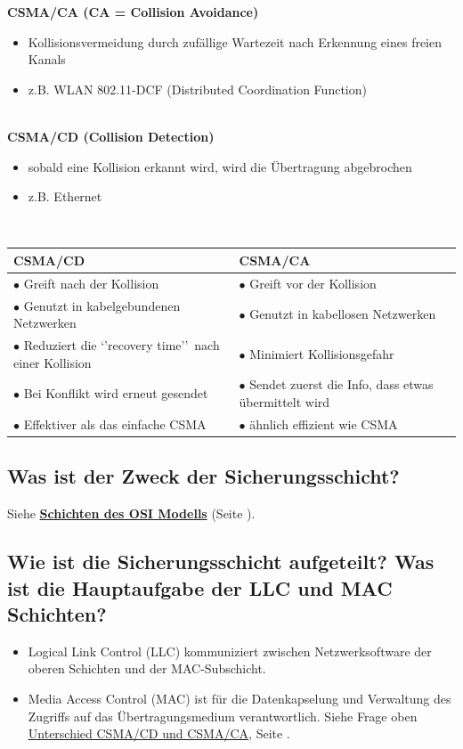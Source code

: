 \textbf{CSMA/CA (CA = Collision Avoidance)}
\begin{itemize}
    \item Kollisionsvermeidung durch zufällige Wartezeit nach Erkennung eines freien Kanals
    \item z.B. WLAN 802.11-DCF (Distributed Coordination Function)
\end{itemize}\,\\

\textbf{CSMA/CD (Collision Detection)}
\begin{itemize}
    \item sobald eine Kollision erkannt wird, wird die Übertragung abgebrochen
    \item z.B. Ethernet
\end{itemize}\,\\

\begin{tabularx}{\textwidth}{X|X}
    \multicolumn{1}{X}{CSMA/CD}&\multicolumn{1}{X}{CSMA/CA}\\
    \hline
    $\bullet$ Greift nach der Kollision&$\bullet$ Greift vor der Kollision\\
    $\bullet$ Genutzt in kabelgebundenen Netzwerken&$\bullet$ Genutzt in kabellosen Netzwerken\\
    $\bullet$ Reduziert die `'recovery time'' nach einer Kollision&$\bullet$ Minimiert Kollisionsgefahr\\
    $\bullet$ Bei Konflikt wird erneut gesendet&$\bullet$ Sendet zuerst die Info, dass etwas übermittelt wird\\
    $\bullet$ Effektiver als das einfache CSMA&$\bullet$ ähnlich effizient wie CSMA\\
\end{tabularx}


\subsection*{Was ist der Zweck der Sicherungsschicht?}\label{sub:Sicherungsschicht}
Siehe \textbf{\hyperref[sub:SchichtenOSIModell]{Schichten des OSI Modells}} (Seite \pageref{sub:SchichtenOSIModell}).

\pagebreak
\subsection*{Wie ist die Sicherungsschicht aufgeteilt? Was ist die Hauptaufgabe der LLC und MAC Schichten?}\label{sub:LLC_MAC}
\begin{itemize}
    \item Logical Link Control (LLC) kommuniziert zwischen Netzwerksoftware der oberen Schichten und der MAC-Subschicht.
    \item Media Access Control (MAC) ist für die Datenkapselung und Verwaltung des Zugriffs auf das Übertragungsmedium verantwortlich. Siehe Frage oben \underline{\hyperref[sub:csma]{Unterschied CSMA/CD und CSMA/CA}}, Seite \pageref{sub:csma}.
\end{itemize}

